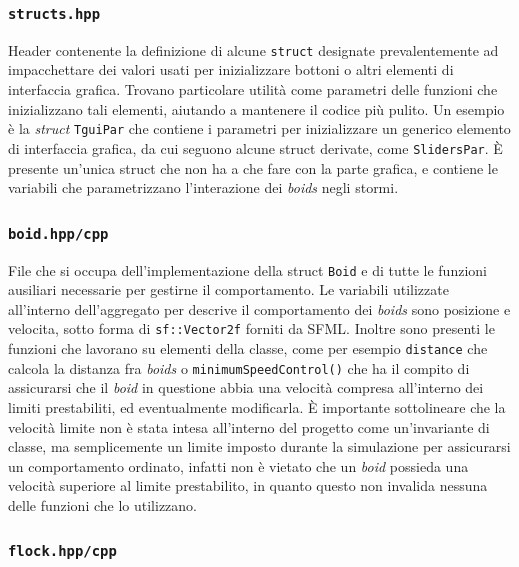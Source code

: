 \documentclass[10pt,a4paper]{article}
\begin{document}
\subsubsection{\texttt{structs.hpp}}

Header contenente la definizione di alcune \texttt{struct} designate prevalentemente ad impacchettare dei valori usati per inizializzare bottoni o altri elementi di interfaccia grafica. Trovano particolare utilità come parametri delle funzioni che inizializzano tali elementi, aiutando a mantenere il codice più pulito. Un esempio è la \textit{struct} \texttt{TguiPar} che contiene i parametri per inizializzare un generico elemento di interfaccia grafica, da cui seguono alcune struct derivate, come \texttt{SlidersPar}. È presente un'unica struct che non ha a che fare con la parte grafica, e contiene le variabili che parametrizzano l'interazione dei \textit{boids} negli stormi.

\subsubsection{\texttt{boid.hpp/cpp}}

File che si occupa dell'implementazione della struct \texttt{Boid} e di tutte le funzioni ausiliari necessarie per gestirne il comportamento. Le variabili utilizzate all'interno dell'aggregato per descrive il comportamento dei \textit{boids} sono posizione e velocita, sotto forma di \texttt{sf::Vector2f} forniti da SFML. Inoltre sono presenti le funzioni che lavorano su elementi della classe, come per esempio \texttt{distance} che calcola la distanza fra \textit{boids} o \texttt{minimumSpeedControl()} che ha il compito di assicurarsi che il \textit{boid} in questione abbia una velocità compresa all'interno dei limiti prestabiliti, ed eventualmente modificarla. È importante sottolineare che la velocità limite non è stata intesa all'interno del progetto come un'invariante di classe, ma semplicemente un limite imposto durante la simulazione per assicurarsi un comportamento ordinato, infatti non è vietato che un \textit{boid} possieda una velocità superiore al limite prestabilito, in quanto questo non invalida nessuna delle funzioni che lo utilizzano.

\subsubsection{\texttt{flock.hpp/cpp}}
\end{document}
